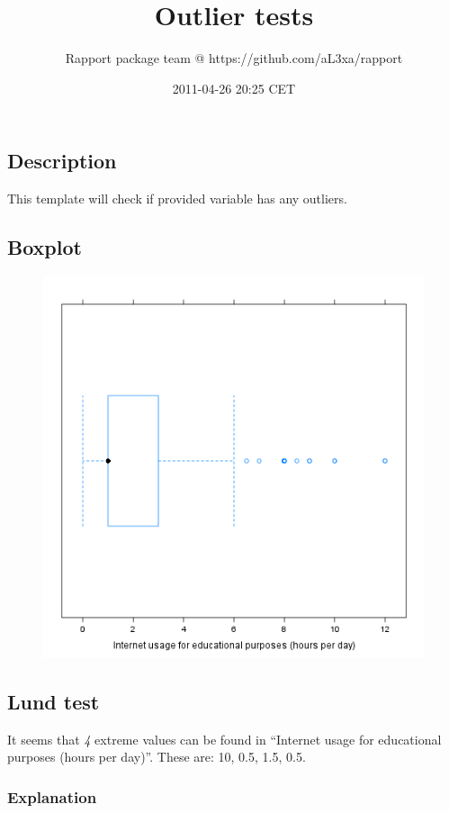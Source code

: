 \documentclass[]{article}
\title{Outlier tests}
\author{Rapport package team @ https://github.com/aL3xa/rapport}
\date{2011-04-26 20:25 CET}
\makeatletter
\def\maxwidth{\ifdim\Gin@nat@width>\linewidth\linewidth
\else\Gin@nat@width\fi}
\let\Oldincludegraphics\includegraphics
\renewcommand{\includegraphics}[1]{\Oldincludegraphics[width=\maxwidth]{#1}}
\makeatother
\begin{document}
\maketitle

\subsection{Description}

This template will check if provided variable has any outliers.

\subsection{Boxplot}

\begin{figure}[htbp]
\centering
\includegraphics{d24b3eb41da4d1de21d4bce0e30d2e1b.png}
\caption{}
\end{figure}

\subsection{Lund test}

It seems that \emph{4} extreme values can be found in ``Internet usage
for educational purposes (hours per day)''. These are: 10, 0.5, 1.5,
0.5.

\subsubsection{Explanation}
\end{document}
